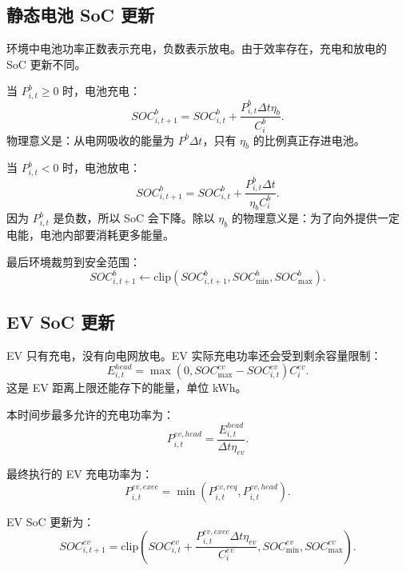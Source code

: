 \documentclass[UTF8,zihao=-4]{ctexart}
\begin{document}
\subsection{静态电池 SoC 更新}

环境中电池功率正数表示充电，负数表示放电。由于效率存在，充电和放电的 SoC 更新不同。

当 $P^b_{i,t}\ge 0$ 时，电池充电：
\begin{equation}
SOC^b_{i,t+1}
=SOC^b_{i,t}
+\frac{P^b_{i,t}\Delta t\eta_b}{C^b_i}.
\end{equation}
物理意义是：从电网吸收的能量为 $P^b\Delta t$，只有 $\eta_b$ 的比例真正存进电池。

当 $P^b_{i,t}<0$ 时，电池放电：
\begin{equation}
SOC^b_{i,t+1}
=SOC^b_{i,t}
+\frac{P^b_{i,t}\Delta t}{\eta_b C^b_i}.
\end{equation}
因为 $P^b_{i,t}$ 是负数，所以 SoC 会下降。除以 $\eta_b$ 的物理意义是：为了向外提供一定电能，电池内部要消耗更多能量。

最后环境裁剪到安全范围：
\begin{equation}
SOC^b_{i,t+1}\leftarrow
\mathrm{clip}(SOC^b_{i,t+1},SOC^b_{\min},SOC^b_{\max}).
\end{equation}

\subsection{EV SoC 更新}

EV 只有充电，没有向电网放电。EV 实际充电功率还会受到剩余容量限制：
\begin{equation}
E^{head}_{i,t}
=\max(0,SOC^{ev}_{\max}-SOC^{ev}_{i,t})C^{ev}_i.
\end{equation}
这是 EV 距离上限还能存下的能量，单位 kWh。

本时间步最多允许的充电功率为：
\begin{equation}
P^{ev,head}_{i,t}
=\frac{E^{head}_{i,t}}{\Delta t\eta_{ev}}.
\end{equation}

最终执行的 EV 充电功率为：
\begin{equation}
P^{ev,exec}_{i,t}
=\min(P^{ev,req}_{i,t},P^{ev,head}_{i,t}).
\end{equation}

EV SoC 更新为：
\begin{equation}
SOC^{ev}_{i,t+1}
=\mathrm{clip}\left(
SOC^{ev}_{i,t}
+\frac{P^{ev,exec}_{i,t}\Delta t\eta_{ev}}{C^{ev}_i},
SOC^{ev}_{\min},SOC^{ev}_{\max}
\right).
\end{equation}
\end{document}
